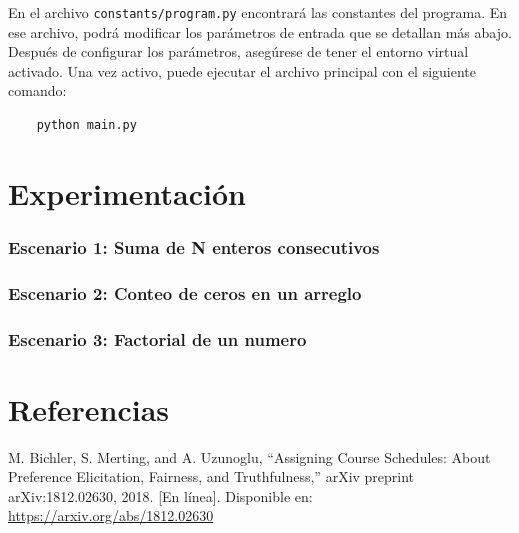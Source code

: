 \documentclass{article}
\begin{document}
En el archivo \texttt{constants/program.py} encontrará las constantes del programa.
En ese archivo, podrá modificar los parámetros de entrada que se detallan más abajo.\\

Después de configurar los parámetros, asegúrese de tener el entorno virtual activado.
Una vez activo, puede ejecutar el archivo principal con el siguiente comando:

\begin{center}
  \begin{adjustbox}{minipage=\linewidth, center}
    \begin{verbatim}
    python main.py
  \end{verbatim}
  \end{adjustbox}
\end{center}


\section{Experimentación}\label{sec:exp}

\subsubsection{Escenario 1: Suma de N enteros consecutivos }

\subsubsection{Escenario 2: Conteo de ceros en un arreglo }

\subsubsection{Escenario 3: Factorial de un numero}


\section{Referencias}
\renewcommand{\refname}{}

\begin{thebibliography}{9}

   \label{ref:BPS} M. Bichler, S. Merting, and A. Uzunoglu,
  “Assigning Course Schedules: About Preference Elicitation, Fairness, and Truthfulness,”
  arXiv preprint arXiv:1812.02630, 2018. [En línea]. Disponible en:
  \url{https://arxiv.org/abs/1812.02630}


\end{thebibliography}
\end{document}
